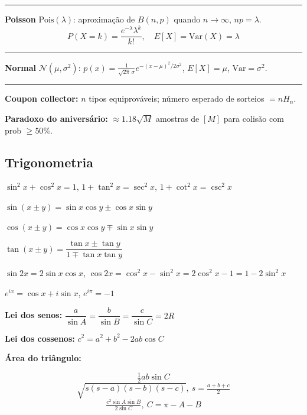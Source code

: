 \noindent\rule{\linewidth}{0.2pt}

\textbf{Poisson} $\text{Pois}(\lambda)$: aproximação de $B(n,p)$ quando $n\to\infty$, $np=\lambda$.
\[P(X=k)=\frac{e^{-\lambda}\lambda^k}{k!}, \quad E[X]=\text{Var}(X)=\lambda\]

\noindent\rule{\linewidth}{0.2pt}

\textbf{Normal} $\mathcal{N}(\mu,\sigma^2)$: $p(x)=\frac{1}{\sqrt{2\pi}\,\sigma}e^{-(x-\mu)^2/2\sigma^2}$, $E[X]=\mu$, $\text{Var}=\sigma^2$.

\noindent\rule{\linewidth}{0.2pt}

\textbf{Coupon collector:} $n$ tipos equiprováveis; número esperado de sorteios $=nH_n$.

\textbf{Paradoxo do aniversário:} $\approx1.18\sqrt{M}$ amostras de $[M]$ para colisão com prob $\geq50\%$.

\subsection{Trigonometria}

$\sin^2x+\cos^2x=1$, $1+\tan^2x=\sec^2x$, $1+\cot^2x=\csc^2x$

$\sin(x\pm y)=\sin x\cos y\pm\cos x\sin y$

$\cos(x\pm y)=\cos x\cos y\mp\sin x\sin y$

$\tan(x\pm y)=\dfrac{\tan x\pm\tan y}{1\mp\tan x\tan y}$

$\sin2x=2\sin x\cos x$, $\cos2x=\cos^2x-\sin^2x=2\cos^2x-1=1-2\sin^2x$

$e^{ix}=\cos x+i\sin x$, $e^{i\pi}=-1$

\textbf{Lei dos senos:} $\dfrac{a}{\sin A}=\dfrac{b}{\sin B}=\dfrac{c}{\sin C}=2R$

\textbf{Lei dos cossenos:} $c^2=a^2+b^2-2ab\cos C$

\textbf{Área do triângulo:}

\begin{center}
\end{center}

\[\tfrac{1}{2}ab\sin C\]
\[\sqrt{s(s-a)(s-b)(s-c)},\ s=\tfrac{a+b+c}{2}\]
\[\tfrac{c^2\sin A\sin B}{2\sin C},\ C=\pi-A-B\]

